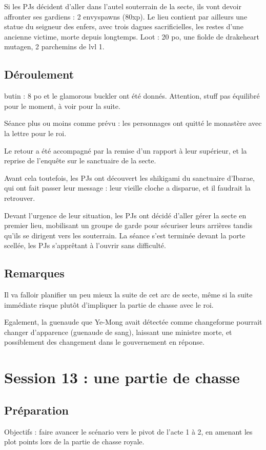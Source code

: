 \documentclass[10pt,a4paper]{book}
\begin{document}
Si les PJs décident d'aller dans l'autel souterrain de la secte, ils vont devoir affronter ses gardiens : 2 envyspawns (80xp). Le lieu contient par ailleurs une statue du seigneur des enfers, avec trois dagues sacrificielles, les restes d'une ancienne victime, morte depuis longtemps. Loot : 20 po, une fiolde de drakeheart mutagen, 2 parchemins de lvl 1.


\subsection{Déroulement}
butin : 8 po et le glamorous buckler ont été donnés. Attention, stuff pas équilibré pour le moment, à voir pour la suite.

Séance plus ou moins comme prévu : les personnages ont quitté le monastère avec la lettre pour le roi. 

Le retour a été accompagné par la remise d'un rapport à leur supérieur, et la reprise de l'enquête sur le sanctuaire de la secte.

Avant cela toutefois, les PJs ont découvert les shikigami du sanctuaire d'Ibarae, qui ont fait passer leur message : leur vieille cloche a disparue, et il faudrait la retrouver.

Devant l'urgence de leur situation, les PJs ont décidé d'aller gérer la secte en premier lieu, mobilisant un groupe de garde pour sécuriser leurs arrières tandis qu'ils se dirigent vers les souterrain. La séance s'est terminée devant la porte scellée, les PJs s'apprêtant à l'ouvrir sans difficulté.
\subsection{Remarques}
Il va falloir planifier un peu mieux la suite de cet arc de secte, même si la suite immédiate risque plutôt d'impliquer la partie de chasse avec le roi.

Egalement, la guenaude que Ye-Mong avait détectée comme changeforme pourrait changer d'apparence (guenaude de sang), laissant une ministre morte, et possiblement des changement dans le gouvernement en réponse.
\section{Session 13 : une partie de chasse}
\subsection{Préparation}
Objectifs : faire avancer le scénario vers le pivot de l'acte 1 à 2, en amenant les plot points lors de la partie de chasse royale.
\end{document}
